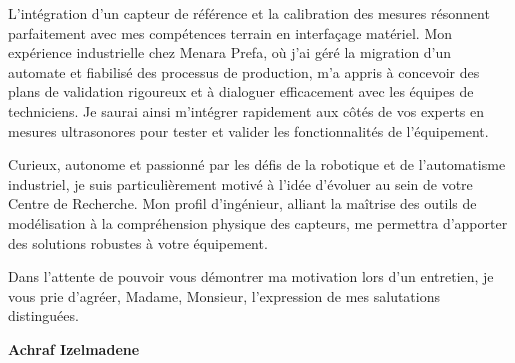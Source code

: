 \documentclass[10pt,a4paper]{altacv}
\begin{document}
\vspace{0.4cm}

L'intégration d'un capteur de référence et la calibration des mesures résonnent parfaitement avec mes compétences terrain en interfaçage matériel. Mon expérience industrielle chez Menara Prefa, où j'ai géré la migration d'un automate et fiabilisé des processus de production, m'a appris à concevoir des plans de validation rigoureux et à dialoguer efficacement avec les équipes de techniciens. Je saurai ainsi m'intégrer rapidement aux côtés de vos experts en mesures ultrasonores pour tester et valider les fonctionnalités de l'équipement.

\vspace{0.4cm}

Curieux, autonome et passionné par les défis de la robotique et de l'automatisme industriel, je suis particulièrement motivé à l'idée d'évoluer au sein de votre Centre de Recherche. Mon profil d'ingénieur, alliant la maîtrise des outils de modélisation à la compréhension physique des capteurs, me permettra d'apporter des solutions robustes à votre équipement.

\vspace{0.4cm}

Dans l'attente de pouvoir vous démontrer ma motivation lors d'un entretien, je vous prie d'agréer, Madame, Monsieur, l'expression de mes salutations distinguées.

\vspace{0.5cm}

\vfill

\begin{flushright}
  \Large\color{emphasis}\textbf{Achraf Izelmadene}
\end{flushright}
\end{document}
